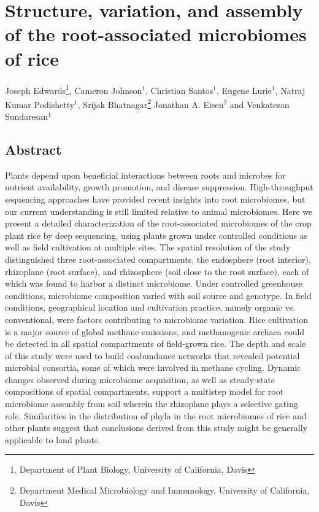 \chapter{Structure, variation, and assembly of the root-associated microbiomes of rice}

Joseph Edwards\footnote[1]{Department of Plant Biology, University of California, Davis}, Cameron Johnson$^1$, Christian Santos$^1$, Eugene Lurie$^1$, Natraj Kumar Podishetty$^1$, Srijak Bhatnagar\footnote[1]{Department Medical Microbiology and Immunology, University of California, Davis} Jonathan A. Eisen$^2$ and Venkatesan Sundaresan$^1$

\section{Abstract}
Plants depend upon beneficial interactions between roots and microbes for nutrient availability, growth promotion, and disease suppression. High-throughput sequencing approaches have provided recent insights into root microbiomes, but our current understanding is still limited relative to animal microbiomes. Here we present a detailed characterization of the root-associated microbiomes of the crop plant rice by deep sequencing, using plants grown under controlled conditions as well as field cultivation at multiple sites. The spatial resolution of the study distinguished three root-associated compartments, the endosphere (root interior), rhizoplane (root surface), and rhizosphere (soil close to the root surface), each of which was found to harbor a distinct microbiome. Under controlled greenhouse conditions, microbiome composition varied with soil source and genotype. In field conditions, geographical location and cultivation practice, namely organic vs. conventional, were factors contributing to microbiome variation. Rice cultivation is a major source of global methane emissions, and methanogenic archaea could be detected in all spatial compartments of field-grown rice. The depth and scale of this study were used to build coabundance networks that revealed potential microbial consortia, some of which were involved in methane cycling. Dynamic changes observed during microbiome acquisition, as well as steady-state compositions of spatial compartments, support a multistep model for root microbiome assembly from soil wherein the rhizoplane plays a selective gating role. Similarities in the distribution of phyla in the root microbiomes of rice and other plants suggest that conclusions derived from this study might be generally applicable to land plants.